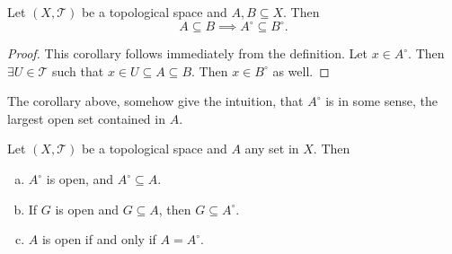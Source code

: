 \begin{corollary}
	Let $(X,\mathcal{T})$ be a topological space and $A,B \subseteq X$. Then 
	\[ A \subseteq B \implies A^\circ \subseteq B^\circ. \]
\end{corollary}
\begin{proof}
	This corollary follows immediately from the definition. Let $x\in A^\circ$. Then $\exists U \in \mathcal{T}$ such that $x\in U \subseteq A \subseteq B$. Then $x \in B^\circ$ as well.   
\end{proof}

The corollary above, somehow give the intuition, that $A^\circ$ is in some sense, the largest open set contained in $A$.


\begin{proposition}
	Let $(X,\mathcal{T})$ be a topological space and $A$ any set in $X$. Then 
	\begin{enumerate}[(a)]
		\item $A^\circ$ is open, and $A^\circ \subseteq A$.
		\item If $G$ is open and $G \subseteq A$, then $G \subseteq A^\circ$.
		\item $A$ is open if and only if $A = A^\circ$.
	\end{enumerate}
\end{proposition}

